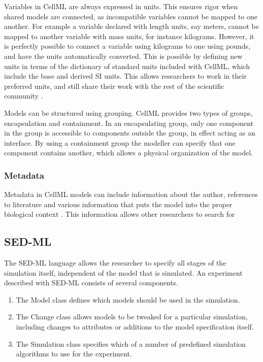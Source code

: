 \documentclass[\rootfolder/main.tex]{subfiles}
\begin{document}
Variables in CellML are always expressed in units.
This ensures rigor when shared models are connected, as incompatible variables cannot be mapped to one another.
For example a variable declared with length units, say meters, cannot be mapped to another variable with mass units, for instance kilograms.
However, it is perfectly possible to connect a variable using kilograms to one using pounds, and have the units automatically converted.
This is possible by defining new units in terms of the dictionary of standard units included with CellML, which include the base and derived SI units.
This allows researchers to work in their preferred units, and still share their work with the rest of the scientific community \cite{cuellar2003}.

Models can be structured using grouping.
CellML provides two types of groups, encapsulation and containment.
In an encapsulating group, only one component in the group is accessible to components outside the group, in effect acting as an interface.
By using a containment group the modeller can specify that one component contains another, which allows a physical organization of the model.

\subsubsection{Metadata}

Metadata in CellML models can include information about the author, references to literature and various information that puts the model into the proper biological context \cite{cuellar2003}.
This information allows other researchers to search for

\subsection{SED-ML}

The SED-ML language allows the researcher to specify all stages of the simulation itself, independent of the model that is simulated.
An experiment described with SED-ML consists of several components.

\begin{enumerate}
    \item The Model class defines which models should be used in the simulation.
    \item The Change class allows models to be tweaked for a particular simulation, including changes to attributes or additions to the model specification itself.
    \item The Simulation class specifies which of a number of predefined simulation algorithms to use for the experiment. \cite{sedml-specification}
\end{enumerate}
\end{document}
